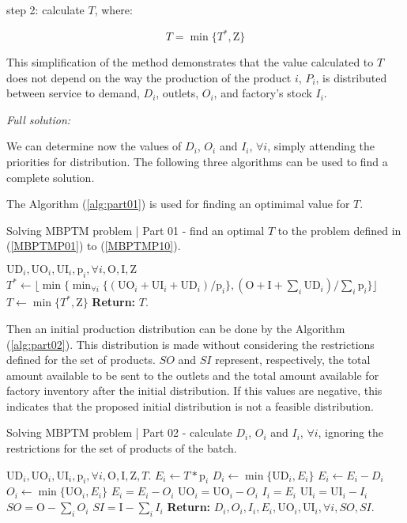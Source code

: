 \documentclass[authoryear,manuscript,12pt]{elsarticle}
\begin{document}
step 2: calculate $T$, where: 

\begin{equation}
T = \min \{T^* , \textrm{Z}\}
\end{equation}

This simplification of the method demonstrates that the value calculated to $T$ does not depend on the way the production of the product $i$, $P_i$, is distributed between service to demand, $D_i$, outlets, $O_i$, and  factory's stock $I_i$.

\noindent \emph{Full solution:} 

We can determine now the values of $D_i$, $O_i$ and $I_i$, $\forall i$, simply attending the priorities for distribution. The following three algorithms can be used to find a complete solution.

The Algorithm (\ref{alg:part01}) is used for finding an optimimal value for $T$.

\begin{algorithm}
\caption{Solving MBPTM problem | Part 01 - find an optimal $T$ to the problem defined in (\ref{MBPTMP01}) to (\ref{MBPTMP10}).}\label{alg:part01}
\begin{algorithmic}
	\Require $\textrm{UD}_i, \textrm{UO}_i, \textrm{UI}_i, \textrm{p}_i, \forall i, \textrm{O}, \textrm{I}, \textrm{Z}$
	\State $T^* \gets \lfloor{\min \{\min_{\forall i} \{(\textrm{UO}_i + \textrm{UI}_i + \textrm{UD}_i) / \textrm{p}_i\},(\textrm{O} + \textrm{I} + \sum_i \textrm{UD}_i) / \sum_i {\textrm{p}_i}\}}\rfloor$
	\State $T \gets \min \{T^* , \textrm{Z}\}$
\State \textbf{Return:} $T$.
\end{algorithmic}
\end{algorithm}

Then an initial production distribution can be done by the Algorithm (\ref{alg:part02}). This distribution is made without considering the restrictions defined for the set of products. $SO$ and $SI$ represent, respectively, the total amount available to be sent to the outlets and the total amount available for factory inventory after the initial distribution. If this values are negative, this indicates that the proposed initial distribution is not a feasible distribution.

\begin{algorithm}
\caption{Solving MBPTM problem | Part 02 - calculate $D_i$, $O_i$ and $I_i$, $\forall i$, ignoring the restrictions for the set of products of the batch.}\label{alg:part02}
\begin{algorithmic}
	\Require $\textrm{UD}_i, \textrm{UO}_i, \textrm{UI}_i, \textrm{p}_i, \forall i, \textrm{O}, \textrm{I}, \textrm{Z}, T$.
		\State $E_i \gets T * \textrm{p}_i$
		\State $D_i \gets \min \{\textrm{UD}_i, E_i\}$
		\State $E_i \gets E_i - D_i$
		\State $O_i \gets \min \{\textrm{UO}_i, E_i\}$
		\State $E_i = E_i - O_i$
		\State $\textrm{UO}_i = \textrm{UO}_i - O_i$
		\State $I_i = E_i$
		\State $\textrm{UI}_i = \textrm{UI}_i - I_i$
	\EndFor
	\State $SO = \textrm{O} - \sum_i{O_i}$
	\State $SI = \textrm{I} - \sum_i{I_i}$
	\State \textbf{Return:} $D_i, O_i, I_i, E_i, \textrm{UO}_i, \textrm{UI}_i, \forall i, SO, SI$.
\end{algorithmic}
\end{algorithm}
\end{document}
